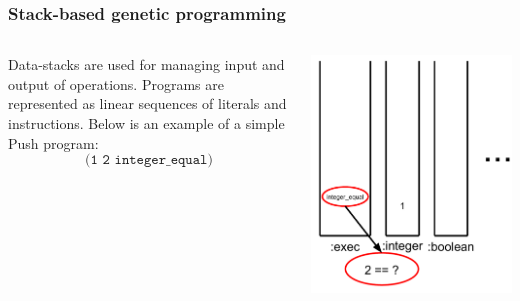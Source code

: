 \documentclass{beamer}
\newcommand{\linespace}{\vskip 0.25cm}
\begin{document}
\begin{frame}
	\frametitle{Stack-based genetic programming}
	\begin{columns}
		\begin{column}{0.6\textwidth}
			Data-stacks are used for managing input and output of operations.
			\linespace
			\linespace
			\linespace
			Programs are represented as linear sequences of literals and instructions. Below is an example of a simple Push program:
			\[\texttt{(1 2 integer\_equal)}\]
		\end{column}
		\begin{column}{0.4\textwidth}
			\includegraphics[height=1.2\textwidth]{Illustrations/stack_7.PDF}
		\end{column}
	\end{columns}
\end{frame}
\end{document}
